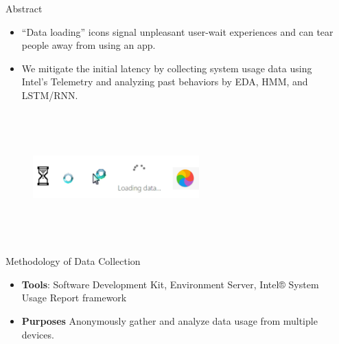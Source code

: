 \documentclass[final]{beamer}
\newlength{\sepwidth}
\newlength{\colwidth}
\newcommand{\separatorcolumn}{\begin{column}{\sepwidth}\end{column}}
\begin{document}
\begin{frame}[t]
  \begin{columns}[t]
    \separatorcolumn

    \begin{column}{\colwidth}

      \begin{block}{\huge{Abstract}}

        {
          \fontsize{37pt}{44.4pt} \selectfont 
          \begin{itemize}
            \item “Data loading” icons signal unpleasant user-wait experiences and can tear people away from using an app.
            \item We mitigate the initial latency by collecting system usage data using Intel’s Telemetry and analyzing past behaviors by EDA, HMM, and LSTM/RNN.
        \end{itemize}
        }
        \begin{figure}\includegraphics[width=0.6\textwidth, height=5cm]{user-wait.jpeg}\end{figure}

      \end{block}

      \begin{alertblock}{\huge{Methodology of Data Collection}}

        {
          \fontsize{37pt}{44.4pt} \selectfont 
          \begin{itemize}
            \item \textbf{Tools}: Software Development Kit, Environment Server, Intel® System Usage Report framework
            \item \textbf{Purposes} Anonymously gather and analyze data usage from multiple devices. 
          \end{itemize}
        }
        

\end{alertblock}
\end{column}
\end{columns}
\end{frame}
\end{document}
